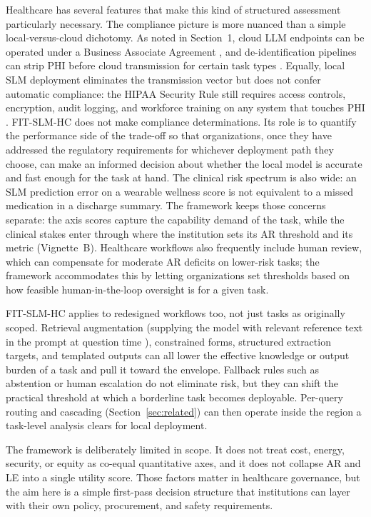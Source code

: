 \documentclass[11pt]{article}
\begin{document}
Healthcare has several features that make this kind of structured assessment particularly necessary. The compliance picture is more nuanced than a simple local-versus-cloud dichotomy. As noted in Section~1, cloud LLM endpoints can be operated under a Business Associate Agreement \cite{HHSBAA, Marks2023HIPAAAI}, and de-identification pipelines can strip PHI before cloud transmission for certain task types \cite{Kovacevic2024DeID}. Equally, local SLM deployment eliminates the transmission vector but does not confer automatic compliance: the HIPAA Security Rule still requires access controls, encryption, audit logging, and workforce training on any system that touches PHI \cite{HHS2013SecurityRule}. FIT-SLM-HC does not make compliance determinations. Its role is to quantify the performance side of the trade-off so that organizations, once they have addressed the regulatory requirements for whichever deployment path they choose, can make an informed decision about whether the local model is accurate and fast enough for the task at hand. The clinical risk spectrum is also wide: an SLM prediction error on a wearable wellness score is not equivalent to a missed medication in a discharge summary. The framework keeps those concerns separate: the axis scores capture the capability demand of the task, while the clinical stakes enter through where the institution sets its AR threshold and its metric (Vignette~B). Healthcare workflows also frequently include human review, which can compensate for moderate AR deficits on lower-risk tasks; the framework accommodates this by letting organizations set thresholds based on how feasible human-in-the-loop oversight is for a given task.

FIT-SLM-HC applies to redesigned workflows too, not just tasks as originally scoped. Retrieval augmentation (supplying the model with relevant reference text in the prompt at question time \cite{Lewis2020}), constrained forms, structured extraction targets, and templated outputs can all lower the effective knowledge or output burden of a task and pull it toward the envelope. Fallback rules such as abstention or human escalation do not eliminate risk, but they can shift the practical threshold at which a borderline task becomes deployable. Per-query routing and cascading (Section~\ref{sec:related}) can then operate inside the region a task-level analysis clears for local deployment.

The framework is deliberately limited in scope. It does not treat cost, energy, security, or equity as co-equal quantitative axes, and it does not collapse AR and LE into a single utility score. Those factors matter in healthcare governance, but the aim here is a simple first-pass decision structure that institutions can layer with their own policy, procurement, and safety requirements.
\end{document}
